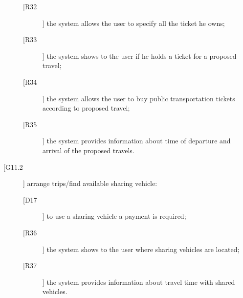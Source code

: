 \begin{description}
\begin{description}
	\newline
	\item[[R32]] the system allows the user to specify all the ticket he owns;
	\item[[R33]] the system shows to the user if he holds a ticket for a proposed travel;
	\item[[R34]] the system allows the user to buy public transportation tickets according to proposed travel;
	\item[[R35]] the system provides information about time of departure and arrival of the proposed travels.
	\end{description}
\item[[G11.2]] arrange trips/find available sharing vehicle:
	\begin{description}
	\item[[D17]] to use a sharing vehicle a payment is required;
	\newline
	\item[[R36]] the system shows to the user where sharing vehicles are located;
	\item[[R37]] the system provides information about travel time with shared vehicles.
	\end{description}
\end{description}